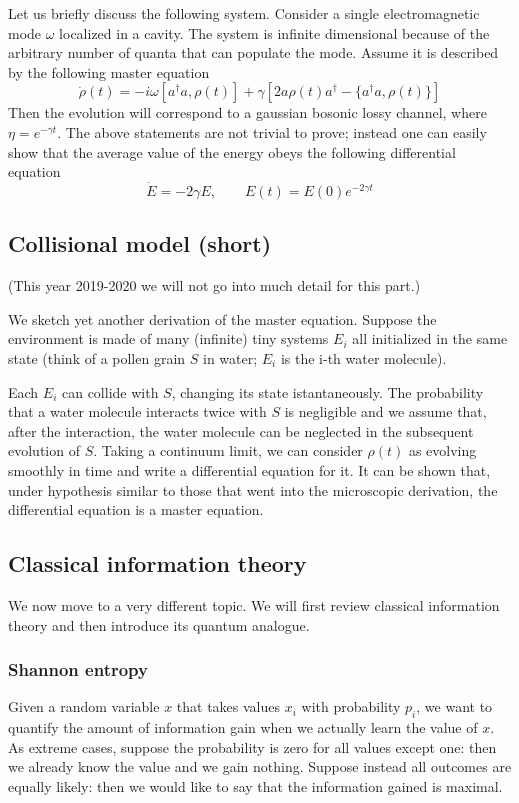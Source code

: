 \documentclass[a4paper, 11pt]{article}
\begin{document}
	Let us briefly discuss the following system. Consider a single electromagnetic mode $\omega$ localized in a cavity. The system is infinite dimensional because of the arbitrary number of quanta that can populate the mode. Assume it is described by the following master equation
	\[ \dot{\rho}(t) = -i \omega[a^\dagger a, \rho(t)] + \gamma [2a\rho(t) a^\dagger - \{a^\dagger a, \rho(t) \}] \]
	Then the evolution will correspond to a gaussian bosonic lossy channel, where $\eta = e^{-\gamma t}$.
	The above statements are not trivial to prove; instead one can easily show that the average value of the energy obeys the following differential equation
	\[ \dot{E} = -2 \gamma E,\qquad E(t) = E(0) e^{-2\gamma t} \]
	
	\subsection{Collisional model (short)}
	(This year 2019-2020 we will not go into much detail for this part.)
	
	We sketch yet another derivation of the master equation. Suppose the environment is made of many (infinite) tiny systems $E_i$ all initialized in the same state (think of a pollen grain $S$ in water; $E_i$ is the i-th water molecule).
	
	Each $E_i$ can collide with $S$, changing its state istantaneously. The probability that a water molecule interacts twice with $S$ is negligible and we assume that, after the interaction, the water molecule can be neglected in the subsequent evolution of $S$.
	Taking a continuum limit, we can consider $\rho(t)$ as evolving smoothly in time and write a differential equation for it. It can be shown that, under hypothesis similar to those that went into the microscopic derivation, the differential equation is a master equation.
	
	\subsection{Classical information theory}
	We now move to a very different topic. We will first review classical information theory and then introduce its quantum analogue.
	
	\subsubsection{Shannon entropy}
	Given a random variable $x$ that takes values $x_i$ with probability $p_i$, we want to quantify the amount of information gain when we actually learn the value of $x$. As extreme cases, suppose the probability is zero for all values except one: then we already know the value and we gain nothing. Suppose instead all outcomes are equally likely: then we would like to say that the information gained is maximal.
	
\end{document}
